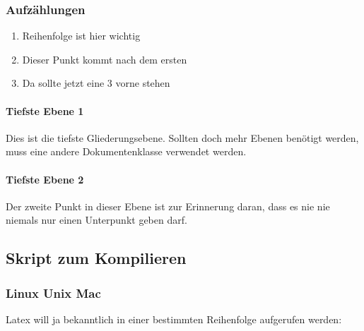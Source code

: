 \subsubsection{Aufzählungen}
\begin{enumerate}
\item Reihenfolge ist hier wichtig
\item Dieser Punkt kommt nach dem ersten
\item Da sollte jetzt eine 3 vorne stehen
\end{enumerate}

\paragraph{Tiefste Ebene 1}
Dies ist die tiefste Gliederungsebene. Sollten doch mehr Ebenen benötigt werden, muss eine andere Dokumentenklasse verwendet werden.

\paragraph{Tiefste Ebene 2}
Der zweite Punkt in dieser Ebene ist zur Erinnerung daran, dass es nie nie niemals nur einen Unterpunkt geben darf.


\subsection{Skript zum Kompilieren}
\subsubsection{Linux Unix Mac}
Latex will ja bekanntlich in einer bestimmten Reihenfolge aufgerufen werden:
